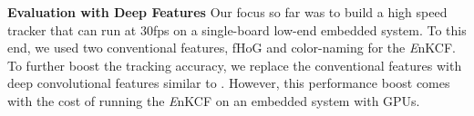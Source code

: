 \documentclass[10pt,twocolumn,letterpaper]{article}
\begin{document}
\textbf{Evaluation with Deep Features} Our focus so far was to build a
high speed tracker that can run at $30$fps on a single-board low-end 
embedded system. To this end, we used two conventional features, fHoG and
color-naming for the {\it E}nKCF. To further boost the tracking accuracy, we replace
the conventional features with deep convolutional features similar to \cite{ma2015hierarchical,
  danelljan2015convolutional}. However, this performance boost comes with the cost
  of running the {\it E}nKCF on an embedded system with GPUs.

\end{document}

